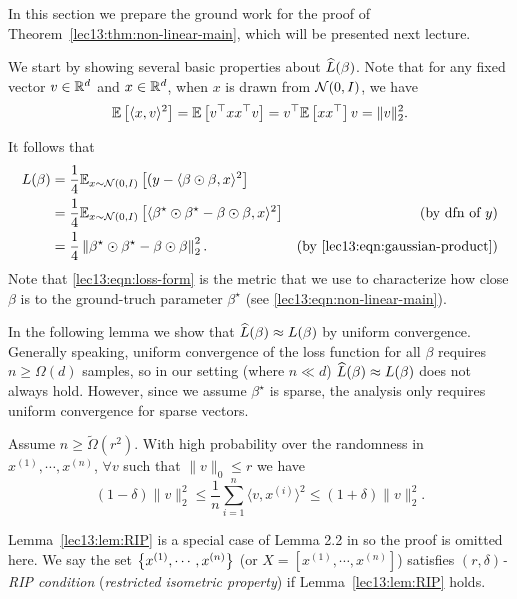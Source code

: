 
In this section we prepare the ground work for the proof of Theorem~\ref{lec13:thm:non-linear-main}, which will be presented next lecture.

We start by showing several basic properties about $\widehat{L}(\beta)$. Note that for any fixed vector $v\in\mathbb R^{d}$ and $x\in \mathbb R^{d}$, when $x$ is drawn from $\mathcal N(0,I)$, we have
\begin{equation}\label{lec13:eqn:gaussian-product}
    \mathbb{E} \left[\langle x, v\rangle^2 \right]=\mathbb{E} \left[ v^\top xx^\top v \right]=v^\top\mathbb{E} \left[ xx^\top \right]v=\|v\|_2^2.
\end{equation}

It follows that 
\begin{align}
    L(\beta)&=\frac{1}{4}\mathbb{E}_{x\sim \mathcal N(0,I)} \left[(y-\langle \beta\odot\beta,x\rangle^2 \right] \\
    &=\frac{1}{4}\mathbb{E}_{x\sim \mathcal N(0,I)} \left[\langle \beta^\star\odot\beta^\star-\beta\odot\beta,x\rangle^2 \right] &\text{(by dfn of $y$)} \\
    &=\frac{1}{4} \left\| \beta^\star\odot\beta^\star-\beta\odot\beta \right\|_2^2.\label{lec13:eqn:loss-form} &\text{(by \eqref{lec13:eqn:gaussian-product})}
\end{align}
Note that \eqref{lec13:eqn:loss-form} is the metric that we use to characterize how close $\beta$ is to the ground-truch parameter $\beta^\star$ (see \eqref{lec13:eqn:non-linear-main}).

In the following lemma we show that $\widehat{L}(\beta) \approx L(\beta)$ by uniform convergence. Generally speaking, uniform convergence of the loss function for all $\beta$ requires $n\ge \Omega(d)$ samples, so in our setting (where $n\ll d$) $\widehat{L}(\beta) \approx L(\beta)$ does not always hold. However, since we assume $\beta^\star$ is sparse, the analysis only requires uniform convergence for sparse vectors.

\begin{lemma}\label{lec13:lem:RIP}
Assume $n\ge \widetilde\Omega(r^2)$. With high probability over the randomness in $x^{(1)},\cdots,x^{(n)}$, $\forall v$ such that $\|v\|_0\le r$ we have
\begin{equation}\label{lec13:eqn:RIP}
(1-\delta)\|v\|_2^2\le \frac{1}{n}\sum_{i=1}^{n}\langle v,x^{(i)}\rangle^2\le (1+\delta)\|v\|_2^2.
\end{equation}
\end{lemma}

Lemma~\ref{lec13:lem:RIP} is a special case of Lemma 2.2 in \cite{li2018algorithmic} so the proof is omitted here. We say the set $\left\{ x^{(1)},\cdots,x^{(n)} \right\}$ (or $X=[x^{(1)},\cdots,x^{(n)}]$) satisfies $(r,\delta)$\textit{-RIP condition} (\textit{restricted isometric property}) if Lemma~\ref{lec13:lem:RIP} holds.

